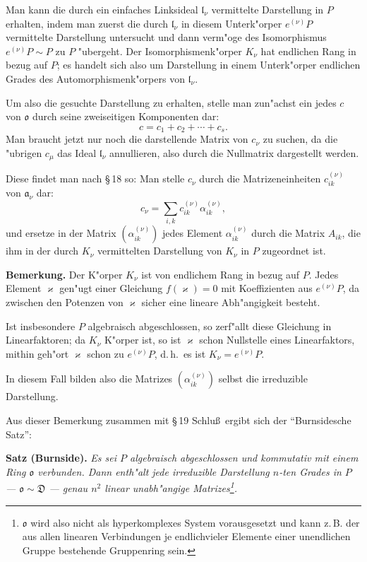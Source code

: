 \documentclass[12pt,a4paper]{article}
\theoremstyle{plain}
\begin{document}
Man kann die durch ein einfaches Linksideal $\mathfrak{l}_\nu$ vermittelte Darstellung in $P$ erhalten, indem man zuerst die durch $\mathfrak{l}_\nu$ in diesem Unterk"orper $e^{(\nu)}P$ vermittelte Darstellung untersucht und dann verm"oge des Isomorphismus $e^{(\nu)}P \sim P$ zu $P$ "ubergeht. Der Isomorphismenk"orper $K_\nu$ hat endlichen Rang in bezug auf $P$; es handelt sich also um Darstellung in einem Unterk"orper endlichen Grades des Automorphismenk"orpers von $\mathfrak{l}_\nu$.

Um also die gesuchte Darstellung zu erhalten, stelle man zun"achst ein jedes $c$ von $\mathfrak{o}$ durch seine zweiseitigen Komponenten dar:
\[
c = c_1 + c_2 + \cdots + c_s.
\]
Man braucht jetzt nur noch die darstellende Matrix von $c_\nu$ zu suchen, da die "ubrigen $c_\mu$ das Ideal $\mathfrak{l}_\nu$ annullieren, also durch die Nullmatrix dargestellt werden.

Diese findet man nach \S\,18 so: Man stelle $c_\nu$ durch die Matrizeneinheiten $c^{(\nu)}_{ik}$ von $\mathfrak{a}_\nu$ dar:
\[
c_\nu = \sum_{i,k} c^{(\nu)}_{ik}\alpha^{(\nu)}_{ik},
\]
und ersetze in der Matrix $(\alpha^{(\nu)}_{ik})$ jedes Element $\alpha^{(\nu)}_{ik}$ durch die Matrix $A_{ik}$, die ihm in der durch $K_\nu$ vermittelten Darstellung von $K_\nu$ in $P$ zugeordnet ist.

\medskip\noindent\textbf{Bemerkung.}
Der K"orper $K_\nu$ ist von endlichem Rang in bezug auf $P$. Jedes Element $\varkappa$ gen"ugt einer Gleichung $f(\varkappa) = 0$ mit Koeffizienten aus $e^{(\nu)}P$, da zwischen den Potenzen von $\varkappa$ sicher eine lineare Abh"angigkeit besteht.

Ist insbesondere $P$ algebraisch abgeschlossen, so zerf"allt diese Gleichung in Linearfaktoren; da $K_\nu$ K"orper ist, so ist $\varkappa$ schon Nullstelle eines Linearfaktors, mithin geh"ort $\varkappa$ schon zu $e^{(\nu)}P$, d.\,h.\ es ist $K_\nu = e^{(\nu)}P$.

In diesem Fall bilden also die Matrizes $(\alpha^{(\nu)}_{ik})$ selbst die irreduzible Darstellung.

Aus dieser Bemerkung zusammen mit \S\,19 Schlu\ss\ ergibt sich der ``Burnsidesche Satz'':

\medskip\noindent\textbf{Satz (Burnside).}
\textit{Es sei $P$ algebraisch abgeschlossen und kommutativ mit einem Ring $\mathfrak{o}$ verbunden. Dann enth"alt jede irreduzible Darstellung $n$-ten Grades in $P$ --- $\mathfrak{o} \sim \mathfrak{D}$ --- genau $n^2$ linear unabh"angige Matrizes\footnote{$\mathfrak{o}$ wird also nicht als hyperkomplexes System vorausgesetzt und kann z.\,B. der aus allen linearen Verbindungen je endlichvieler Elemente einer unendlichen Gruppe bestehende Gruppenring sein.}.}
\end{document}
